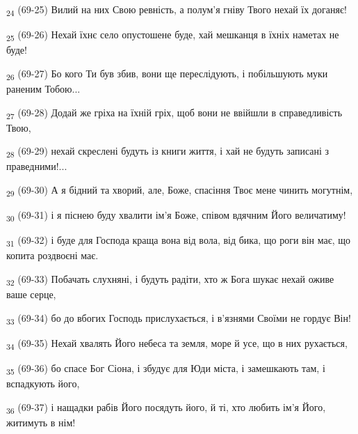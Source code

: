 \begin{tcolorbox}
\textsubscript{24} (69-25) Вилий на них Свою ревність, а полум'я гніву Твого нехай їх доганяє!
\end{tcolorbox}
\begin{tcolorbox}
\textsubscript{25} (69-26) Нехай їхнє село опустошене буде, хай мешканця в їхніх наметах не буде!
\end{tcolorbox}
\begin{tcolorbox}
\textsubscript{26} (69-27) Бо кого Ти був збив, вони ще переслідують, і побільшують муки раненим Тобою...
\end{tcolorbox}
\begin{tcolorbox}
\textsubscript{27} (69-28) Додай же гріха на їхній гріх, щоб вони не ввійшли в справедливість Твою,
\end{tcolorbox}
\begin{tcolorbox}
\textsubscript{28} (69-29) нехай скреслені будуть із книги життя, і хай не будуть записані з праведними!...
\end{tcolorbox}
\begin{tcolorbox}
\textsubscript{29} (69-30) А я бідний та хворий, але, Боже, спасіння Твоє мене чинить могутнім,
\end{tcolorbox}
\begin{tcolorbox}
\textsubscript{30} (69-31) і я піснею буду хвалити ім'я Боже, співом вдячним Його величатиму!
\end{tcolorbox}
\begin{tcolorbox}
\textsubscript{31} (69-32) і буде для Господа краща вона від вола, від бика, що роги він має, що копита роздвоєні має.
\end{tcolorbox}
\begin{tcolorbox}
\textsubscript{32} (69-33) Побачать слухняні, і будуть радіти, хто ж Бога шукає нехай оживе ваше серце,
\end{tcolorbox}
\begin{tcolorbox}
\textsubscript{33} (69-34) бо до вбогих Господь прислухається, і в'язнями Своїми не гордує Він!
\end{tcolorbox}
\begin{tcolorbox}
\textsubscript{34} (69-35) Нехай хвалять Його небеса та земля, море й усе, що в них рухається,
\end{tcolorbox}
\begin{tcolorbox}
\textsubscript{35} (69-36) бо спасе Бог Сіона, і збудує для Юди міста, і замешкають там, і вспадкують його,
\end{tcolorbox}
\begin{tcolorbox}
\textsubscript{36} (69-37) і нащадки рабів Його посядуть його, й ті, хто любить ім'я Його, житимуть в нім!
\end{tcolorbox}
